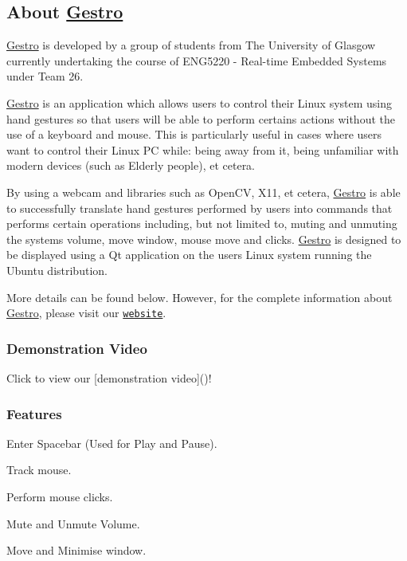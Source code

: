 \subsection*{About \hyperlink{namespaceGestro}{Gestro}}

\hyperlink{namespaceGestro}{Gestro} is developed by a group of students from The University of Glasgow currently undertaking the course of E\+N\+G5220 -\/ Real-\/time Embedded Systems under Team 26.

\hyperlink{namespaceGestro}{Gestro} is an application which allows users to control their Linux system using hand gestures so that users will be able to perform certains actions without the use of a keyboard and mouse. This is particularly useful in cases where users want to control their Linux PC while\+: being away from it, being unfamiliar with modern devices (such as Elderly people), et cetera.

By using a webcam and libraries such as Open\+CV, X11, et cetera, \hyperlink{namespaceGestro}{Gestro} is able to successfully translate hand gestures performed by users into commands that performs certain operations including, but not limited to, muting and unmuting the system\textquotesingle{}s volume, move window, mouse move and clicks. \hyperlink{namespaceGestro}{Gestro} is designed to be displayed using a Qt application on the users\textquotesingle{} Linux system running the Ubuntu distribution.

More details can be found below. However, for the complete information about \hyperlink{namespaceGestro}{Gestro}, please visit our \href{https://randomguy-coder.github.io/Gestro/}{\tt website}.

\subsubsection*{Demonstration Video}

Click to view our \mbox{[}demonstration video\mbox{]}()!

  

\subsubsection*{Features}


\begin{DoxyItemize}
\item Enter Spacebar (Used for Play and Pause).
\item Track mouse.
\item Perform mouse clicks.
\item Mute and Unmute Volume.
\item Move and Minimise window.
\end{DoxyItemize}

